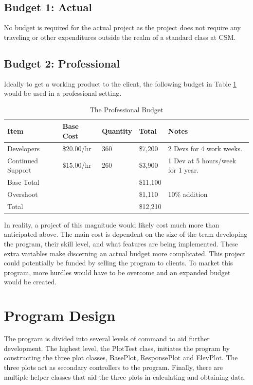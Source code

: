 \documentclass[12pt]{article}
\begin{document}
\subsection{Budget 1: Actual}

No budget is required for the actual project as the project does not require any traveling or other expenditures outside the realm of a standard class at CSM.

\subsection{Budget 2: Professional}

Ideally to get a working product to the client, the following budget in Table \ref{TAB:BUG} would be used in a professional setting. 

\begin{table}[h]
\caption{The Professional Budget}
\begin{tabular}{ l | l | l || l | l}
  \hline                        
  Item & Base Cost & Quantity & Total & Notes \\ \hline
  Developers & \$20.00/hr & 360 & \$7,200 & 2 Devs for 4 work weeks.\\
  Continued Support & \$15.00/hr & 260 & \$3,900 & 1 Dev at 5 hours/week for 1 year.\\ \hline
  Base Total & & & \$11,100 & \\
  Overshoot & & & \$1,110 & 10\% addition\\ \hline
  Total & & & \$12,210 & \\
  \hline  
\end{tabular} 
\label{TAB:BUG}
\end{table}

In reality, a project of this magnitude would likely cost much more than anticipated above. The main cost is dependent on the size of the team developing the program, their skill level, and what features are being implemented. These extra variables make discerning an actual budget more complicated. This project could potentially be funded by selling the program to clients. To market this program, more hurdles would have to be overcome and an expanded budget would be created.

\section{Program Design}

The program is divided into several levels of command to aid further development. The highest level, the PlotTest class, initiates the program by constructing the three plot classes, BasePlot, ResponsePlot and ElevPlot. The three plots act as secondary controllers to the program. Finally, there are multiple helper classes that aid the three plots in calculating and obtaining data. \\
\end{document}
